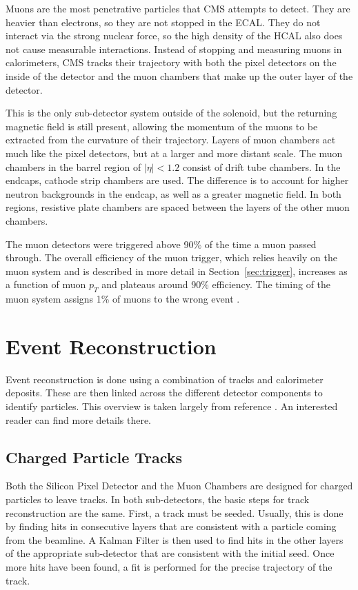 Muons are the most penetrative particles that CMS attempts to detect.
They are heavier than electrons, so they are not stopped in the ECAL.
They do not interact via the strong nuclear force,
so the high density of the HCAL also does not cause measurable interactions.
Instead of stopping and measuring muons in calorimeters,
CMS tracks their trajectory with both the pixel detectors on the inside of the detector
and the muon chambers that make up the outer layer of the detector.

This is the only sub-detector system outside of the solenoid,
but the returning magnetic field is still present,
allowing the momentum of the muons to be extracted from the curvature of their trajectory.
Layers of muon chambers act much like the pixel detectors, but at a larger and more distant scale.
The muon chambers in the barrel region of $|\eta| < 1.2$ consist of drift tube chambers.
In the endcaps, cathode strip chambers are used.
The difference is to account for higher neutron backgrounds in the endcap, as well as a greater magnetic field.
In both regions, resistive plate chambers are spaced between the layers of the other muon chambers.

The muon detectors were triggered above 90\% of the time a muon passed through.
The overall efficiency of the muon trigger, which relies heavily on the muon system
and is described in more detail in Section~\ref{sec:trigger},
increases as a function of muon $p_T$ and plateaus around 90\% efficiency.
The timing of the muon system assigns 1\% of muons to the wrong event \cite{Pozzobon_2019}.

\section{Event Reconstruction} \label{sec:event-reco}

Event reconstruction is done using a combination of tracks and calorimeter deposits.
These are then linked across the different detector components to identify particles.
This overview is taken largely from reference \cite{Sirunyan_2017}.
An interested reader can find more details there.

\subsection{Charged Particle Tracks} \label{sec:tracks}

Both the Silicon Pixel Detector and the Muon Chambers are designed
for charged particles to leave tracks.
In both sub-detectors, the basic steps for track reconstruction are the same.
First, a track must be seeded.
Usually, this is done by finding hits in consecutive layers that are consistent
with a particle coming from the beamline.
A Kalman Filter is then used to find hits in the other layers of the appropriate sub-detector
that are consistent with the initial seed.
Once more hits have been found, a fit is performed for the precise trajectory of the track.

